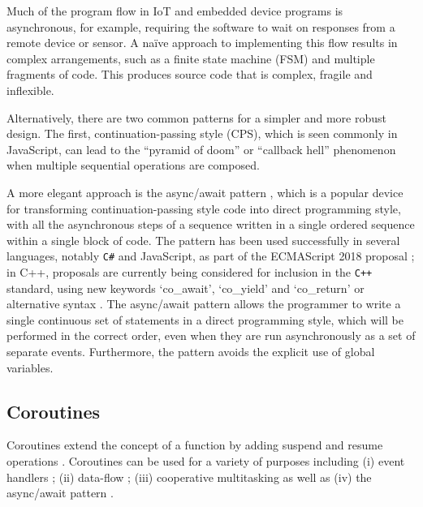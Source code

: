 \documentclass[format=acmsmall, review=false, screen=false]{acmart}
\providecommand{\DIFadd}[1]{{\protect\color{blue}\uwave{#1}}} %
\providecommand{\DIFaddbegin}{} %
\providecommand{\DIFaddend}{} %
\providecommand{\DIFdelbegin}{} %
\providecommand{\DIFdelend}{} %
\newcommand{\DIFscaledelfig}{0.5}
\newlength{\DIFdelgraphicswidth} %
\newlength{\DIFdelgraphicsheight} %
\newcommand{\DIFaddincludegraphics}[2][]{{\color{blue}\fbox{\DIFOincludegraphics[#1]{#2}}}} %
\newcommand{\DIFdelincludegraphics}[2][]{%
\sbox{\DIFdelgraphicsbox}{\DIFOincludegraphics[#1]{#2}}%
\settoboxwidth{\DIFdelgraphicswidth}{\DIFdelgraphicsbox} %
\settoboxtotalheight{\DIFdelgraphicsheight}{\DIFdelgraphicsbox} %
\scalebox{\DIFscaledelfig}{%
\parbox[b]{\DIFdelgraphicswidth}{\usebox{\DIFdelgraphicsbox}\\[-\baselineskip] \rule{\DIFdelgraphicswidth}{0em}}\llap{\resizebox{\DIFdelgraphicswidth}{\DIFdelgraphicsheight}{%
\setlength{\unitlength}{\DIFdelgraphicswidth}%
\begin{picture}(1,1)%
\thicklines\linethickness{2pt} %
{\color[rgb]{1,0,0}\put(0,0){\framebox(1,1){}}}%
{\color[rgb]{1,0,0}\put(0,0){\line( 1,1){1}}}%
{\color[rgb]{1,0,0}\put(0,1){\line(1,-1){1}}}%
\end{picture}%
}\hspace*{3pt}}} %
} %
\DeclareRobustCommand{\DIFaddbegin}{\DIFOaddbegin \let\includegraphics\DIFaddincludegraphics} %
\DeclareRobustCommand{\DIFaddend}{\DIFOaddend \let\includegraphics\DIFOincludegraphics} %
\DeclareRobustCommand{\DIFdelbegin}{\DIFOdelbegin \let\includegraphics\DIFdelincludegraphics} %
\DeclareRobustCommand{\DIFdelend}{\DIFOaddend \let\includegraphics\DIFOincludegraphics} %
\begin{document}
Much of the program flow in IoT and embedded device programs is asynchronous, for example, requiring the software to wait on responses from a remote device or sensor. A naïve approach to implementing this flow results in complex arrangements, such as a finite state machine (FSM) and multiple fragments of code. This produces source code that is complex, fragile and inflexible.

Alternatively, there are two common patterns for a simpler and more robust design. The first, continuation-passing style (CPS), which is seen commonly in JavaScript, can lead to the “pyramid of doom” or “callback hell” phenomenon \cite{Brodu2015, Edwards2009, Madsen2017, Kambona2013} when multiple sequential operations are composed.

A more elegant approach is the async/await pattern \cite{Bierman2012, Haller2016, Okur2014, Syme2011}, which is a popular device for transforming continuation-passing style code into direct programming style, with all the asynchronous steps of a sequence written in a single ordered sequence within a single block of code. The pattern has been used successfully in several languages, notably \DIFdelbegin %
{\color{red}%
\verb!C#! %
}%
\DIFdelend \DIFaddbegin \DIFadd{C\# }\DIFaddend \cite{Bierman2012, Okur2014} and JavaScript, as part of the ECMAScript 2018 proposal \cite{ECMA2017}; in C++, proposals are currently being considered for inclusion in the \DIFdelbegin %
{\color{red}%
\verb!C++! %
}%
\DIFdelend \DIFaddbegin \DIFadd{C++ 2020 }\DIFaddend standard, using new keywords ‘co\_await’, ‘co\_yield’ and ‘co\_return’ or alternative syntax \cite{ISO2017, Romer2018}. The async/await pattern allows the programmer to write a single continuous set of statements in a direct programming style, which will be performed in the correct order, even when they are run asynchronously as a set of separate events. Furthermore, the pattern avoids the explicit use of global variables.

\subsection{Coroutines}

Coroutines extend the concept of a function by adding suspend and resume operations \cite{Conway1963, Knuth1968, Marlin1979}. Coroutines can be used for a variety of purposes including (i) event handlers \cite{Dunkels2006}; (ii) data-flow \cite{Kugler2013}; (iii) cooperative multitasking \cite{Susilo2009} as well as (iv) the async/await pattern \cite{ISO2017}.
\end{document}
